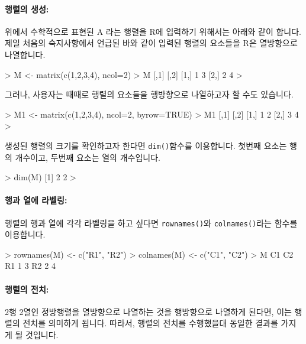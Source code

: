 \documentclass{report}
\begin{document}
\paragraph{행렬의 생성:} 위에서 수학적으로 표현된 A 라는 행렬을 R에 입력하기 위해서는 아래와 같이 합니다. 
제일 처음의 숙지사항에서 언급된 바와 같이 입력된 행렬의 요소들을 R은 열방향으로 나열합니다. 

\begin{Schunk}
\begin{Soutput}
> M <- matrix(c(1,2,3,4), ncol=2)
> M
     [,1] [,2]
[1,]    1    3
[2,]    2    4
>
\end{Soutput}
\end{Schunk}

그러나, 사용자는 때때로 행렬의 요소들을 행방향으로 나열하고자 할 수도 있습니다. 

\begin{Schunk}
\begin{Soutput}
> M1 <- matrix(c(1,2,3,4), ncol=2, byrow=TRUE)
> M1
     [,1] [,2]
[1,]    1    2
[2,]    3    4
>
\end{Soutput}
\end{Schunk}

생성된 행렬의 크기를 확인하고자 한다면 \texttt{dim()}함수를 이용합니다.
첫번째 요소는 행의 개수이고, 두번째 요소는 열의 개수입니다. 

\begin{Schunk}
\begin{Soutput}
> dim(M)
[1] 2 2
>
\end{Soutput}
\end{Schunk}

\paragraph{행과 열에 라벨링:}  행렬의 행과 열에 각각 라벨링을 하고 싶다면 \texttt{rownames()}와 \texttt{colnames()}라는 함수를 이용합니다.

\begin{Schunk}
\begin{Soutput}
> rownames(M) <- c("R1", "R2")
> colnames(M) <- c("C1", "C2")
> M
   C1 C2
R1  1  3
R2  2  4
\end{Soutput}
\end{Schunk}

\paragraph{행렬의 전치: }
2행 2열인 정방행렬을 열방향으로 나열하는 것을 행방향으로 나열하게 된다면, 이는 행렬의 전치를 의미하게 됩니다. 
따라서, 행렬의 전치를 수행했을대 동일한 결과를 가지게 될 것입니다. 
\end{document}
